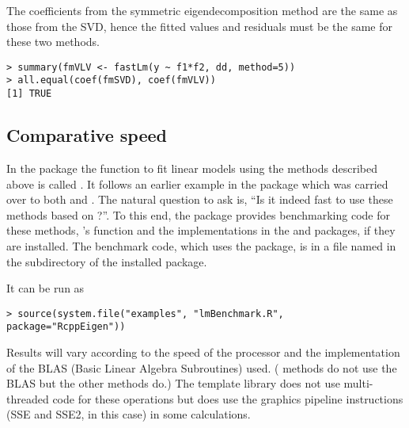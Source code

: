 \documentclass[shortnames,article,nojss]{jss}
\begin{document}
The coefficients from the symmetric eigendecomposition method are the
same as those from the SVD, hence the fitted values and residuals must
be the same for these two methods.

\begin{verbatim}
> summary(fmVLV <- fastLm(y ~ f1*f2, dd, method=5))
> all.equal(coef(fmSVD), coef(fmVLV))
[1] TRUE
\end{verbatim}

\subsection{Comparative speed}

In the  package the  function to fit linear
models using the methods described above is called . It follows
an earlier example in the  package which was carried over to both
 and . The natural question to ask is, ``Is it indeed fast to use these methods
based on ?''.  To this end, the package provides benchmarking code for these
methods, 's  function and the 
implementations in the  \citep{CRAN:RcppArmadillo}
and  \citep{CRAN:RcppGSL} packages, if they are
installed.  The benchmark code, which uses the 
\citep{CRAN:rbenchmark} package, is in a file named
 in the  subdirectory of the
installed  package.


It can be run as
\begin{verbatim}
> source(system.file("examples", "lmBenchmark.R", package="RcppEigen"))
\end{verbatim}
Results will vary according to the speed of the processor and the
implementation of the BLAS (Basic Linear Algebra Subroutines) used.
( methods do not use the BLAS but the other methods do.)
The  template library does not use multi-threaded code for
these operations but does use the graphics pipeline instructions (SSE
and SSE2, in this case) in some calculations. 
\end{document}
